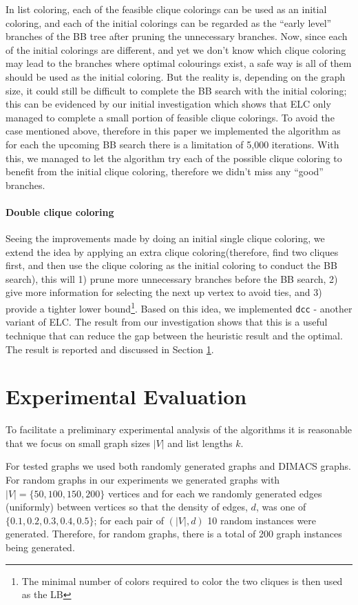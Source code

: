 \documentclass[10pt]{article}
\begin{document}
In list coloring, each of the feasible clique colorings can be used as an initial coloring, and 
each of the initial colorings can be regarded as the ``early level'' branches of the BB tree after pruning the
unnecessary branches. Now, since each of the initial colorings are different, and yet we don't know which 
clique coloring may lead to the branches where optimal colourings exist,   a safe way is all of them should be used as the initial coloring. But the reality is, depending on the graph size, it could still be difficult to complete the BB search with the initial coloring; this can be evidenced by our initial investigation which shows that ELC only managed to complete a small portion of feasible clique colorings.  To avoid the case mentioned above, therefore in this
paper we implemented the algorithm as for each the upcoming BB search there is a limitation of 5,000 iterations. With this, we managed to let the algorithm try each of the possible clique coloring to benefit from the initial clique coloring, therefore we didn't miss any ``good'' branches. 

\paragraph{Double clique coloring} Seeing the improvements made by doing an initial single clique coloring, we extend the idea by applying an extra clique coloring(therefore, find two cliques first, and then use the clique coloring as the initial coloring to conduct the BB search), this will 1) prune more unnecessary branches before the BB search, 2) give more information for selecting the next up vertex to avoid ties, and 3) provide a tighter lower bound\footnote{The minimal number of colors required to color the two cliques is then used as the LB}. Based on this idea, we implemented \texttt{dcc} - another variant of ELC. The result from our investigation shows that this is a useful technique that can reduce the gap between the heuristic result and the optimal. The result is reported and discussed in Section \ref{sec:expers}.

\section{Experimental Evaluation}\label{sec:expers}

To facilitate a preliminary experimental analysis of the algorithms it
is reasonable that we focus on small graph sizes $|V|$ and list lengths $k$.

For tested graphs we used both randomly generated graphs and DIMACS \cite{dimacs} graphs. 
For random graphs in our experiments we generated graphs with $|V|=\{50, 100, 150, 200\}$ vertices and
for each we randomly generated edges (uniformly) between vertices so
that the density of edges, $d$, was one of $\{0.1,0.2,0.3, 0.4, 0.5\}$; for each pair of $(|V|, d)$ 10 random instances 
were generated. Therefore, for random graphs,  there is a total of 200 graph instances being generated. 
\end{document}
